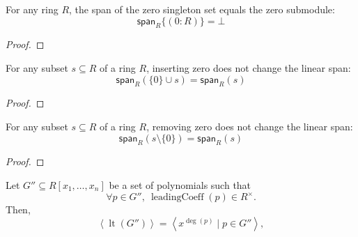         \begin{lemma}\label{span_singleton_zero}
          
          \leanok
          For any ring \( R \), the span of the zero singleton set equals the zero submodule:
\[
  \mathsf{span}_R \{(0 : R)\} = \bot
\]

        \end{lemma}
        
        \begin{proof}
          
          \leanok
        \end{proof}
        

        \begin{lemma}\label{span_insert_zero}
          
          \leanok
          For any subset $s \subseteq R$ of a ring $R$, inserting zero does not change the linear span:
\[
  \mathsf{span}_R(\{0\} \cup s) = \mathsf{span}_R(s)
\]

        \end{lemma}
        
        \begin{proof}
          
          \leanok
        \end{proof}
        

        \begin{lemma}\label{Ideal.span_sdiff_singleton_zero}
          
          \leanok
          For any subset $s \subseteq R$ of a ring $R$, removing zero does not change the linear span:
\[
  \mathsf{span}_R(s \setminus \{0\}) = \mathsf{span}_R(s)
\]

        \end{lemma}
        
        \begin{proof}
          \leanok
        \end{proof}
        

        \begin{lemma}\label{leadingTerm_ideal_span_monomial}
          \leanok
          Let \( G'' \subseteq R[x_1, \dots, x_n] \) be a set of polynomials such that
\[
\forall p \in G'',\ \operatorname{leadingCoeff}(p) \in R^\times.
\]
Then,
\[
\left\langle \operatorname{lt}(G'') \right\rangle = \left\langle x^{\deg(p)} \mid p \in G'' \right\rangle,
\]

        \end{lemma}
        
